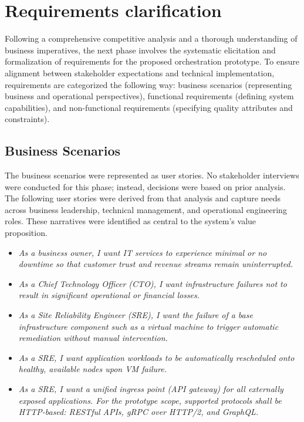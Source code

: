 \section{Requirements clarification}
\label{sec:requirements}

Following a comprehensive competitive analysis and a thorough understanding of business imperatives, the next phase involves the systematic elicitation and formalization of requirements for the proposed orchestration prototype. To ensure alignment between stakeholder expectations and technical implementation, requirements are categorized the following way: business scenarios (representing business and operational perspectives), functional requirements (defining system capabilities), and non-functional requirements (specifying quality attributes and constraints).

\subsection{Business Scenarios}

The business scenarios were represented as user stories. No stakeholder interviews were conducted for this phase; instead, decisions were based on prior analysis. The following user stories were derived from that analysis and capture needs across business leadership, technical management, and operational engineering roles. These narratives were identified as central to the system’s value proposition.

\begin{itemize}

\item \textit{As a business owner, I want IT services to experience minimal or no downtime so that customer trust and revenue streams remain uninterrupted.}

\item \textit{As a Chief Technology Officer (CTO), I want infrastructure failures not to result in significant operational or financial losses.}

\item \textit{As a Site Reliability Engineer (SRE), I want the failure of a base infrastructure component such as a virtual machine to trigger automatic remediation without manual intervention.}

\item \textit{As a SRE, I want application workloads to be automatically rescheduled onto healthy, available nodes upon VM failure.}

\item \textit{As a SRE, I want a unified ingress point (API gateway) for all externally exposed applications. For the prototype scope, supported protocols shall be HTTP-based: RESTful APIs, gRPC over HTTP/2, and GraphQL.}

\end{itemize}

